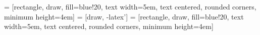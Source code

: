 \documentclass{article}
\begin{document}
\pagestyle{empty}


 = [rectangle, draw, fill=blue!20, 
    text width=5em, text centered, rounded corners, minimum height=4em]
 = [draw, -latex']
 = [rectangle, draw, fill=blue!20, 
    text width=5em, text centered, rounded corners, minimum height=4em]


\end{document}

